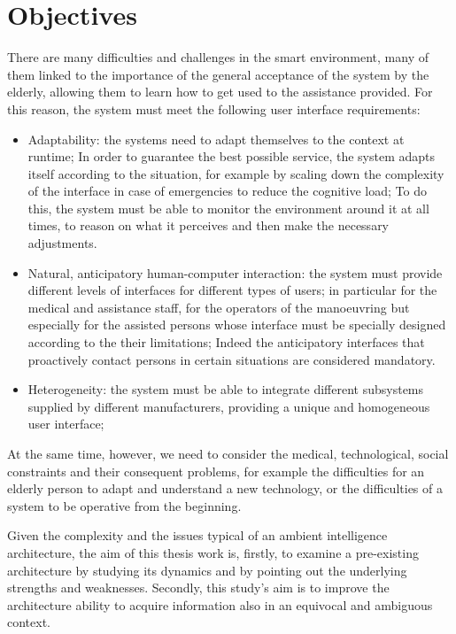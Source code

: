 \documentclass{thesisreport}
\begin{document}
 \section{Objectives}
 There are many difficulties and challenges in the smart environment, many of them linked to the importance of the general acceptance of the system by the elderly, allowing them to learn how to get used to the assistance provided. For this reason, the system must meet the following user interface requirements:
 \begin{itemize}
     \item Adaptability:  the systems need to adapt themselves to the context at runtime;
     In order to guarantee the best possible service, the system adapts itself according to the situation, for example by scaling down the complexity of the interface in case of emergencies to reduce the cognitive load;
     To do this, the system must be able to monitor the environment around it at all times, to reason on what it perceives and then make the necessary adjustments.
     \item  Natural, anticipatory human-computer interaction: the system must provide different levels of interfaces for different types of users; in particular for the medical and assistance staff, for the operators of the manoeuvring but especially for the assisted persons whose interface must be specially designed according to the their limitations; 
     Indeed the anticipatory interfaces that proactively contact persons in certain situations are considered mandatory.
     \item Heterogeneity: the system must be able to integrate different subsystems supplied by different manufacturers, providing a unique and homogeneous user interface;
 \end{itemize}
 At the same time, however, we need to consider the medical, technological, social constraints and their consequent problems, for example the difficulties for an elderly person to adapt and understand a new technology, or the difficulties of a system to be operative from the beginning.
 
 Given the complexity and the issues typical of an ambient intelligence architecture, the aim of this thesis work is, firstly, to examine a pre-existing architecture by studying its dynamics and by pointing out the underlying strengths and weaknesses. Secondly, this study’s aim is to improve the architecture ability to acquire information also in an equivocal and ambiguous context.
 
\end{document}
